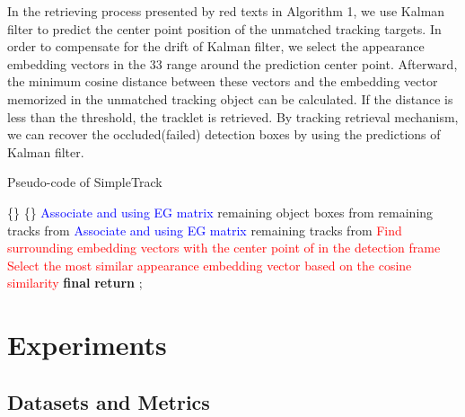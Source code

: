 \documentclass[runningheads]{llncs}
\begin{document}
In the retrieving process presented by red texts in Algorithm 1, we use Kalman filter to predict the center point position of the unmatched tracking targets. In order to compensate for the drift of Kalman filter, we select the appearance embedding vectors in the 33 range around the prediction center point. Afterward, the minimum cosine distance between these vectors and the embedding vector memorized in the unmatched tracking object can be calculated. If the distance is less than the threshold, the tracklet is retrieved. By tracking retrieval mechanism, we can recover the occluded(failed) detection boxes by using the predictions of Kalman filter.

\begin{algorithm}
\caption{Pseudo-code of SimpleTrack}
\LinesNumbered
{}
{
    \;
    \;
    \;
    {
        \If{}
        {
        \{\}\;
        }
        \If{}
        {
        \{\}\;
        }
    }
    {
        \;
    }
    \textcolor{blue}{Associate  and  using EG matrix}\;
    remaining object boxes from \;
    remaining tracks from \;
    \textcolor{blue}{Associate  and  using EG matrix}\;
    remaining tracks from \;
    \textcolor{red}{
    {
        Find surrounding embedding vectors  with the center point of  in the detection frame\;
        Select the most similar appearance embedding vector  based on the cosine similarity\;
        \If{}
        {
          \;
        }
    }}
    \;
    {
        \If{}
        {
           \;
        }
    }
}
\textbf{final} \;
\textbf{return} ;
\end{algorithm}

\section{Experiments}
\subsection{Datasets and Metrics}
\end{document}
